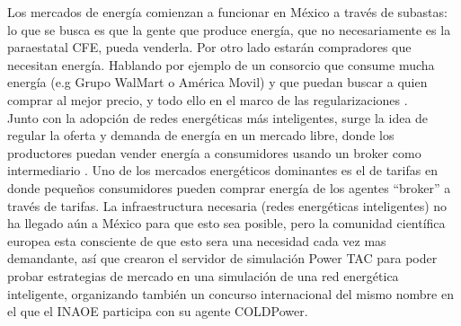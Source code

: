 Los mercados de energía comienzan a funcionar en México a través de subastas: lo que se busca es que la gente que produce energía, que no necesariamente es la paraestatal CFE, pueda venderla. Por otro lado estarán compradores  que necesitan energía. Hablando por ejemplo de un consorcio que consume mucha energía (e.g Grupo WalMart o América Movil) y que puedan buscar a quien comprar al mejor precio, y todo ello en el marco de las regularizaciones \cite{GRiveraProyectoDeIADelInaoe}.\\

Junto con la adopción de redes energéticas más inteligentes, surge la idea de regular la oferta y demanda de energía en un mercado libre, donde los productores puedan vender energía a consumidores usando un broker como intermediario \cite{Fixed-priceTariffG2015}. 
Uno de los mercados energéticos dominantes es el de tarifas en donde pequeños consumidores pueden comprar energía de los agentes ``broker'' a través de tarifas.
La infraestructura necesaria (redes energéticas inteligentes) no ha llegado aún a México para que esto sea posible, pero la comunidad científica europea esta consciente de que esto sera una necesidad cada vez mas demandante, así que crearon el servidor de simulación Power TAC para poder probar estrategias de mercado en una simulación de una red energética inteligente, organizando también un concurso internacional del mismo nombre en el que el INAOE participa con su agente COLDPower.
